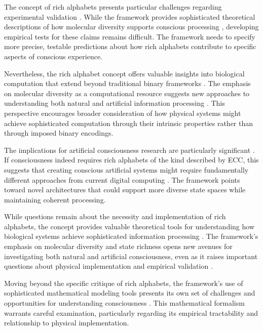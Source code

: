 \begin{refsection}
The concept of rich alphabets presents particular challenges regarding experimental validation \cite{pigliucci2013philosophy}. While the framework provides sophisticated theoretical descriptions of how molecular diversity supports conscious processing \cite{block2009comparing}, developing empirical tests for these claims remains difficult. The framework needs to specify more precise, testable predictions about how rich alphabets contribute to specific aspects of conscious experience.

Nevertheless, the rich alphabet concept offers valuable insights into biological computation that extend beyond traditional binary frameworks \cite{noe2009out}. The emphasis on molecular diversity as a computational resource suggests new approaches to understanding both natural and artificial information processing \cite{koch2019feeling}. This perspective encourages broader consideration of how physical systems might achieve sophisticated computation through their intrinsic properties rather than through imposed binary encodings.

The implications for artificial consciousness research are particularly significant \cite{chalmers2010character}. If consciousness indeed requires rich alphabets of the kind described by ECC, this suggests that creating conscious artificial systems might require fundamentally different approaches from current digital computing \cite{seth2021being}. The framework points toward novel architectures that could support more diverse state spaces while maintaining coherent processing.

While questions remain about the necessity and implementation of rich alphabets, the concept provides valuable theoretical tools for understanding how biological systems achieve sophisticated information processing \cite{goff2019galileo}. The framework's emphasis on molecular diversity and state richness opens new avenues for investigating both natural and artificial consciousness, even as it raises important questions about physical implementation and empirical validation \cite{thompson2014waking}.

Moving beyond the specific critique of rich alphabets, the framework's use of sophisticated mathematical modeling tools presents its own set of challenges and opportunities for understanding consciousness \cite{dennett2017bacteria}. This mathematical formalism warrants careful examination, particularly regarding its empirical tractability and relationship to physical implementation.


\end{refsection}
